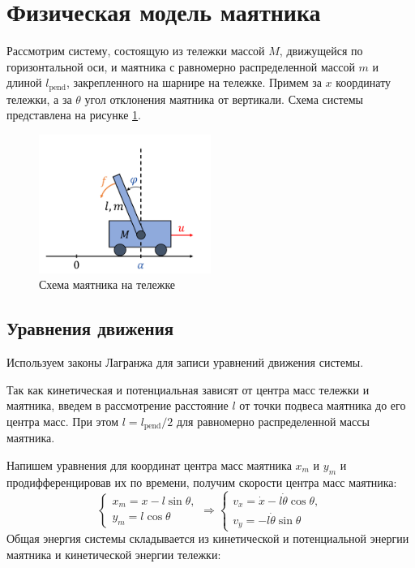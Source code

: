 \section{Физическая модель маятника}

Рассмотрим систему, состоящую из тележки массой $M$, движущейся по горизонтальной оси, и маятника с равномерно распределенной массой $m$ и длиной $l_{\text{pend}}$,
закрепленного на шарнире на тележке. Примем за $x$ координату тележки, а за $\theta$ угол отклонения маятника от вертикали. Схема системы представлена на рисунке \ref{fig:pendulum}.
\begin{figure}[ht!]
    \centering
    \includegraphics[width=0.5\textwidth]{media/cart.png}
    \caption{Схема маятника на тележке}
    \label{fig:pendulum}
\end{figure}

\subsection{Уравнения движения}
Используем законы Лагранжа для записи уравнений движения системы. 

Так как кинетическая и потенциальная зависят от центра масс тележки и маятника, введем в рассмотрение расстояние $l$ 
от точки подвеса маятника до его центра масс. При этом $l = l_{\text{pend}}/2$ для равномерно распределенной массы маятника.

Напишем уравнения для координат центра масс маятника $x_m$ и $y_m$ и продифференцировав их по времени, получим скорости центра масс маятника:
\begin{equation}
    \begin{cases}
        x_m = x - l\sin\theta, \\
        y_m = l\cos\theta
    \end{cases} \Rightarrow
    \begin{cases}
        v_x = \dot{x} - l\dot{\theta}\cos\theta, \\
        v_y = -l\dot{\theta}\sin\theta
    \end{cases}
\end{equation}
Общая энергия системы складывается из кинетической и потенциальной энергии маятника и кинетической энергии тележки:

